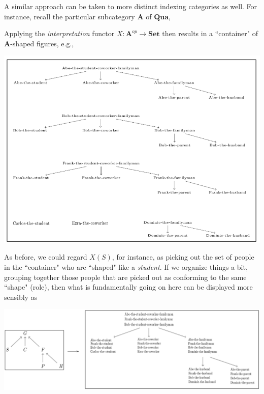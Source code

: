 \documentclass[11pt]{book}
\theoremstyle{definition}
\theoremstyle{definition}
\theoremstyle{definition}
\theoremstyle{theorem}
\theoremstyle{definition}
\begin{document}
A similar approach can be taken to more distinct indexing categories as well. For instance, recall the particular subcategory $\textbf{A}$ of $\textbf{Qua}$, 
	\begin{center}
\end{center}
Applying the \textit{interpretation} functor $X: \textbf{A}^{op} \rightarrow \textbf{Set}$ then results in a ``container" of $\textbf{A}$-shaped figures, e.g., 
\begin{center}
	\includegraphics*[scale=0.38]{LifePicture.png}
\end{center}
As before, we could regard $X(S)$, for instance, as picking out the set of people in the ``container" who are ``shaped" like a \textit{student}. If we organize things a bit, grouping together those people that are picked out as conforming to the same ``shape" (role), then what is fundamentally going on here can be displayed more sensibly as   
\begin{center}
	\includegraphics*[scale=0.28]{QuaPresheaf.png}
\end{center}
\end{document}
